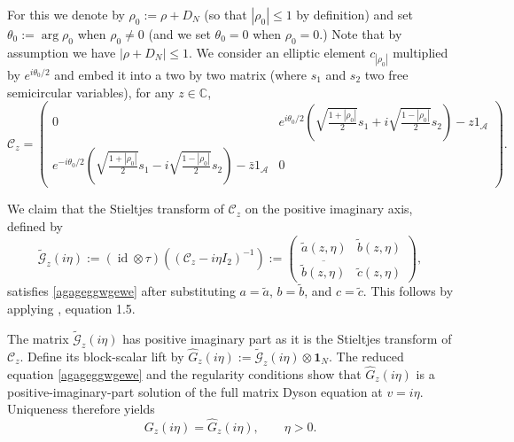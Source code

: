 \documentclass[11pt,reqno]{amsart}
\theoremstyle{plain}
\theoremstyle{remark}
\numberwithin{equation}{section}
\begin{document}
For this we denote by $\rho_0:=\rho+D_N$ (so that $|\rho_0|\leq 1$ by definition) and set $\theta_0:=\arg\rho_0$ when $\rho_0\neq 0$ (and we set $\theta_0=0$ when $\rho_0=0$.) Note that by assumption we have $|\rho+D_N|\leq 1$. We consider an elliptic element $c_{|\rho_0|}$ multiplied by $e^{i\theta_0/2}$ and embed it into a two by two matrix (where $s_1$ and $s_2$ two free semicircular variables), for any $z\in\mathbb{C}$,
$$
\mathcal{C}_z=\begin{pmatrix}
    0&e^{i\theta_0/2}(\sqrt{\frac{1+|\rho_0|}{2}} s_1+i\sqrt{\frac{1-|\rho_0|}{2}} s_2)-z1_{\mathcal{A}}\\e^{-i\theta_0/2}(\sqrt{\frac{1+|\rho_0|}{2}} s_1-i\sqrt{\frac{1-|\rho_0|}{2}} s_2)-\bar{z}1_\mathcal{A}&0
\end{pmatrix}.
$$

We claim that the Stieltjes transform of $\mathcal{C}_z$ on the positive imaginary axis, defined by
$$\widetilde{\mathcal{G}}_z(i\eta):=(\operatorname{id}\otimes\tau
)((\mathcal{C}_z-i\eta I_2)^{-1}):=\begin{pmatrix}
    \widetilde{a}(z,\eta)&\widetilde{b}(z,\eta)\\ \overline{\widetilde{b}(z,\eta)}&\widetilde{c}(z,\eta)
\end{pmatrix},$$
satisfies \eqref{agageggwgewe} after substituting $a=\widetilde{a}$, $b=\widetilde{b}$, and $c=\widetilde{c}$. This follows by applying \cite{haagerup2005new}, equation 1.5.


The matrix $\widetilde{\mathcal{G}}_z(i\eta)$ has positive imaginary part as it is the Stieltjes transform of $\mathcal{C}_z$. Define its block-scalar lift by $\widehat{G}_z(i\eta):=\widetilde{\mathcal{G}}_z(i\eta)\otimes\mathbf{1}_N$.
The reduced equation \eqref{agageggwgewe} and the regularity conditions show that $\widehat{G}_z(i\eta)$ is a positive-imaginary-part solution of the full matrix Dyson equation at $v=i\eta$. Uniqueness therefore yields
$$
G_z(i\eta)=\widehat{G}_z(i\eta),\qquad \eta>0.
$$
\end{document}
